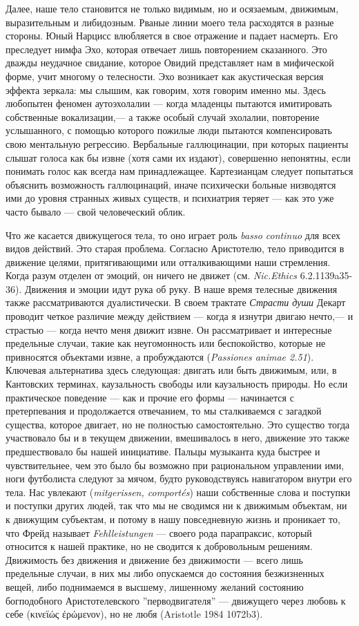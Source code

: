 \documentclass[12pt]{book}
\begin{document}
Далее, наше тело становится не только видимым, но и осязаемым, движимым, выразительным и либидозным. Рваные линии моего тела расходятся в разные стороны. Юный Нарцисс влюбляется в свое отражение и падает насмерть. Его преследует нимфа Эхо, которая отвечает лишь повторением сказанного. Это дважды неудачное свидание, которое Овидий представляет нам в мифической форме, учит многому о телесности. Эхо возникает как акустическая версия эффекта зеркала: мы слышим, как говорим, хотя говорим именно мы. Здесь любопытен феномен аутоэхолалии --- когда младенцы пытаются имитировать собственные вокализации,--- а также особый случай эхолалии, повторение услышанного, с помощью которого пожилые люди пытаются компенсировать свою ментальную регрессию. Вербальные галлюцинации, при которых пациенты слышат голоса как бы извне (хотя сами их издают), совершенно непонятны, если понимать голос как всегда нам принадлежащее. Картезианцам следует попытаться объяснить возможность галлюцинаций, иначе психически больные низводятся ими до уровня странных живых существ, и психиатрия теряет --- как это уже часто бывало --- свой человеческий облик.

Что же касается движущегося тела, то оно играет роль \textit{basso continuo} для всех видов действий. Это старая проблема. Согласно Аристотелю, тело приводится в движение целями, притягивающими или отталкивающими наши стремления. Когда разум отделен от эмоций, он ничего не движет (см. \textit{Nic.Ethics} 6.2.1139a35-36). Движения и эмоции идут рука об руку. В наше время телесные движения также рассматриваются дуалистически. В своем трактате \textit{Страсти души} Декарт проводит четкое различие между действием --- когда я изнутри двигаю нечто,--- и страстью --- когда нечто меня движит извне. Он рассматривает и интересные предельные случаи, такие как неугомонность или беспокойство, которые не привносятся объектами извне, а пробуждаются (\textit{Passiones animae 2.51}). Ключевая альтернатива здесь следующая: двигать или быть движимым, или, в Кантовских терминах, каузальность свободы или каузальность природы. Но если практическое поведение --- как и прочие его формы --- начинается с претерпевания и продолжается отвечанием, то мы сталкиваемся с загадкой существа, которое двигает, но не полностью самостоятельно. Это существо тогда участвовало бы и в текущем движении, вмешивалось в него, движение это также предшествовало бы нашей инициативе. Пальцы музыканта куда быстрее и чувствительнее, чем это было бы возможно при рациональном управлении ими, ноги футболиста следуют за мячом, будто руководствуясь навигатором внутри его тела. Нас увлекают (\textit{mitgerissen, comportés}) наши собственные слова и поступки и поступки других людей, так что мы не сводимся ни к движимым объектам, ни к движущим субъектам, и потому в нашу повседневную жизнь и проникает то, что Фрейд называет \textit{Fehlleistungen} --- своего рода парапраксис, который относится к нашей практике, но не сводится к добровольным решениям. Движимость без движения и движение без движимости --- всего лишь предельные случаи, в них мы либо опускаемся до состояния безжизненных вещей, либо поднимаемся в высшему, лишенному желаний состоянию богподобного Аристотелевского ''перводвигателя'' --- движущего через любовь к себе (κινεϊώς έρώμενον), но не любя (Aristotle 1984 1072b3).
\end{document}
